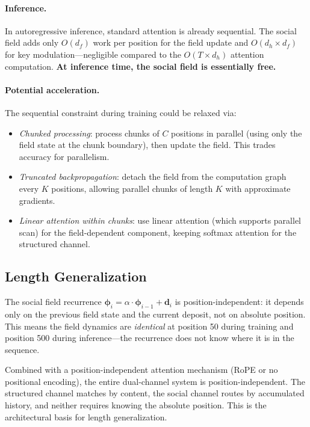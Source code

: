 \documentclass[11pt,a4paper]{article}
\newcommand{\field}{\bm{\phi}}
\newcommand{\retain}{\alpha}
\begin{document}
\paragraph{Inference.}  In autoregressive inference, standard
attention is already sequential.  The social field adds only
$O(d_f)$ work per position for the field update and $O(d_h
\times d_f)$ for key modulation---negligible compared to the
$O(T \times d_h)$ attention computation.  \textbf{At inference
time, the social field is essentially free.}

\paragraph{Potential acceleration.}  The sequential constraint
during training could be relaxed via:
\begin{itemize}
    \item \emph{Chunked processing}: process chunks of $C$ positions
          in parallel (using only the field state at the chunk
          boundary), then update the field.  This trades accuracy for
          parallelism.
    \item \emph{Truncated backpropagation}: detach the field from the
          computation graph every $K$ positions, allowing parallel
          chunks of length $K$ with approximate gradients.
    \item \emph{Linear attention within chunks}: use linear attention
          (which supports parallel scan) for the field-dependent
          component, keeping softmax attention for the structured
          channel.
\end{itemize}

\subsection{Length Generalization}

The social field recurrence $\field_i = \retain \cdot \field_{i-1}
+ \bm{d}_i$ is position-independent: it depends only on the
previous field state and the current deposit, not on absolute
position.  This means the field dynamics are \emph{identical} at
position 50 during training and position 500 during inference---the
recurrence does not know where it is in the sequence.

Combined with a position-independent attention mechanism (RoPE
or no positional encoding), the entire dual-channel system is
position-independent.  The structured channel matches by content,
the social channel routes by accumulated history, and neither
requires knowing the absolute position.  This is the architectural
basis for length generalization.
\end{document}
